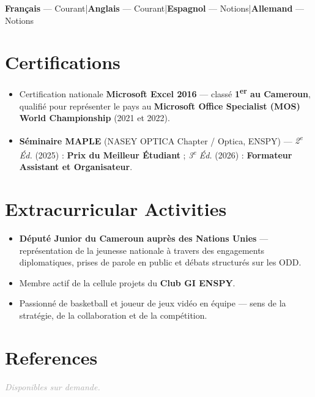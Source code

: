 \documentclass[10pt, a4paper]{article}
\begin{document}
\noindent\textbf{Français} — Courant\quad|\quad\textbf{Anglais} — Courant\quad|\quad\textbf{Espagnol} — Notions\quad|\quad\textbf{Allemand} — Notions

\section{Certifications}

\begin{itemize}
  \item Certification nationale \textbf{Microsoft Excel 2016} — classé \textbf{1\textsuperscript{er}
        au Cameroun}, qualifié pour représenter le pays au \textbf{Microsoft Office Specialist (MOS)
        World Championship} (2021 et 2022).
  \item \textbf{Séminaire MAPLE} (NASEY OPTICA Chapter / Optica, ENSPY) —
        \textit{2\textsuperscript{e} Éd.} (2025) : \textbf{Prix du Meilleur Étudiant} ;
        \textit{3\textsuperscript{e} Éd.} (2026) : \textbf{Formateur Assistant et Organisateur}.
\end{itemize}

\section{Extracurricular Activities}

\begin{itemize}
  \item \textbf{Député Junior du Cameroun auprès des Nations Unies} — représentation de la
        jeunesse nationale à travers des engagements diplomatiques, prises de parole en public
        et débats structurés sur les ODD.
  \item Membre actif de la cellule projets du \textbf{Club GI ENSPY}.
  \item Passionné de basketball et joueur de jeux vidéo en équipe — sens de la stratégie,
        de la collaboration et de la compétition.
\end{itemize}

\section{References}

\textit{\textcolor{darkgray}{Disponibles sur demande.}}
\end{document}
